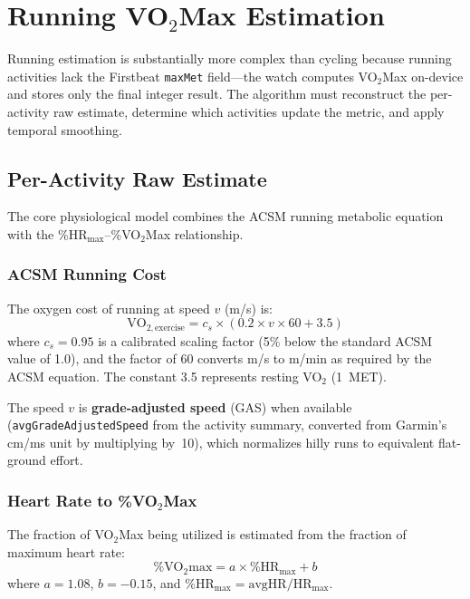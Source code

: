 \documentclass[11pt,a4paper]{article}
\begin{document}
\section{Running VO$_2$Max Estimation}
\label{sec:running}

Running estimation is substantially more complex than cycling because running activities lack the Firstbeat \texttt{maxMet} field---the watch computes VO$_2$Max on-device and stores only the final integer result.
The algorithm must reconstruct the per-activity raw estimate, determine which activities update the metric, and apply temporal smoothing.

\subsection{Per-Activity Raw Estimate}
\label{sec:raw-estimate}

The core physiological model combines the ACSM running metabolic equation with the \%HR$_{\text{max}}$--\%VO$_2$Max relationship.

\subsubsection{ACSM Running Cost}

The oxygen cost of running at speed $v$ (m/s) is:
\begin{equation}
\text{VO}_{2,\text{exercise}} = c_s \times (0.2 \times v \times 60 + 3.5)
\label{eq:acsm}
\end{equation}
where $c_s = 0.95$ is a calibrated scaling factor (5\% below the standard ACSM value of 1.0), and the factor of 60 converts m/s to m/min as required by the ACSM equation.
The constant 3.5 represents resting VO$_2$ (1~MET).

The speed $v$ is \textbf{grade-adjusted speed} (GAS) when available (\texttt{avgGrade\-AdjustedSpeed} from the activity summary, converted from Garmin's cm/ms unit by multiplying by~10), which normalizes hilly runs to equivalent flat-ground effort.

\subsubsection{Heart Rate to \%VO$_2$Max}

The fraction of VO$_2$Max being utilized is estimated from the fraction of maximum heart rate:
\begin{equation}
\%\text{VO}_2\text{max} = a \times \%\text{HR}_{\text{max}} + b
\label{eq:hrmax-model}
\end{equation}
where $a = 1.08$, $b = -0.15$, and $\%\text{HR}_{\text{max}} = \text{avgHR} / \text{HR}_{\text{max}}$.
\end{document}
